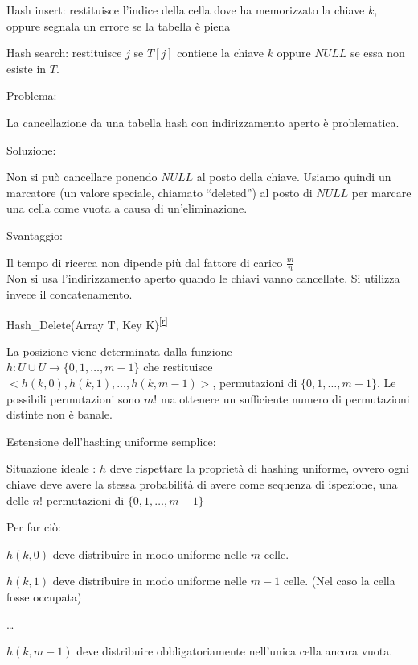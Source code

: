 \documentclass{article}
\begin{document}
{Hash insert: restituisce l'indice della cella dove ha memorizzato la chiave $k$, oppure segnala un errore se la tabella è piena}



{Hash search: restituisce $j$ se $T[j]$ contiene la chiave $k$ oppure $NULL$ se essa non esiste in $T$.}



{Problema:}

{La cancellazione da una tabella hash con indirizzamento aperto è problematica. }

{Soluzione:}

{Non si può cancellare ponendo $NULL$ al posto della chiave. Usiamo quindi un marcatore (un valore speciale, chiamato ``deleted'') al posto di $NULL$ per marcare una cella come vuota a causa di un'eliminazione.}

{Svantaggio:}

{Il tempo di ricerca non dipende più dal fattore di carico $\frac{m}{n}$}\\
{Non si usa l'indirizzamento aperto quando le chiavi vanno cancellate.
Si utilizza invece il concatenamento.}

{Hash\_Delete(Array T, Key
K)}\textsuperscript{\protect\hyperlink{cmnt18}{{[}r{]}}}

{La posizione viene determinata dalla funzione \\ $h:U\cup U\rightarrow \{0,1,\ldots,m-1\}$ che restituisce \\ $<h(k,0),h(k,1),\ldots,h(k,m-1)>$, permutazioni di $\{0,1,\ldots,m-1\}$. Le possibili permutazioni sono $m!$ ma ottenere un sufficiente numero di permutazioni distinte non è banale.}

{Estensione dell'hashing uniforme semplice: }

{Situazione ideale : }{$h$ deve rispettare la proprietà di }{hashing uniforme}{, ovvero ogni chiave deve avere la stessa probabilità di avere come sequenza di ispezione, una delle $n!$ permutazioni di $\{0,1,\ldots,m-1\}$}

{Per far ciò:}

{$h(k,0)$ deve distribuire in modo uniforme nelle $m$ celle.}

{$h(k,1)$ deve distribuire in modo uniforme nelle $m-1$ celle. (Nel caso la cella fosse occupata)}

{\ldots{}}

{$h(k,m-1)$ deve distribuire obbligatoriamente nell'unica cella ancora vuota.}
\end{document}
